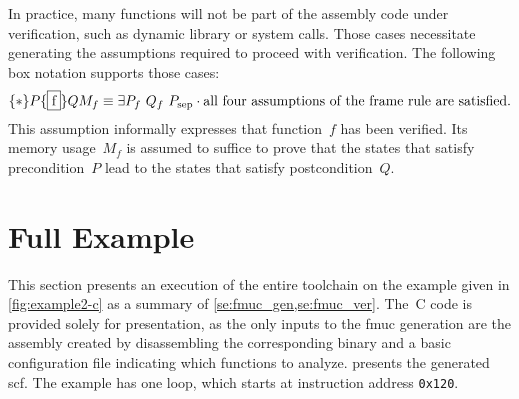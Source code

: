 In practice, many functions will not be part of the assembly code under verification, such as dynamic library or system calls.
Those cases necessitate generating the assumptions required
to proceed with verification.
The following box notation supports those cases:
\begin{equation}
  \{*\}P\{\fbox f\}Q{M_f}\equiv
  \exists P_f~Q_f~P_\mathrm{sep}\cdot
  \text{all four assumptions of the frame rule are satisfied}.
\end{equation}
This assumption informally expresses that function~$f$ has been verified.
Its memory usage~$M_f$ is assumed to suffice to prove that
the states that satisfy precondition~$P$ lead to the states that satisfy
postcondition~$Q$.

\section{Full Example}\label{se:syntax_example}
This section presents an execution of the entire toolchain
on the example given in \cref{fig:example2-c}
as a summary of \cref{se:fmuc_gen,se:fmuc_ver}.
The~C code is provided solely for presentation,
as the only inputs to the \ac{fmuc} generation
are the assembly created by disassembling the corresponding binary%
%
%
and a basic configuration file indicating which functions to analyze.
 presents the generated \ac{scf}.
The example has one loop, which starts at instruction address \texttt{0x120}.%
